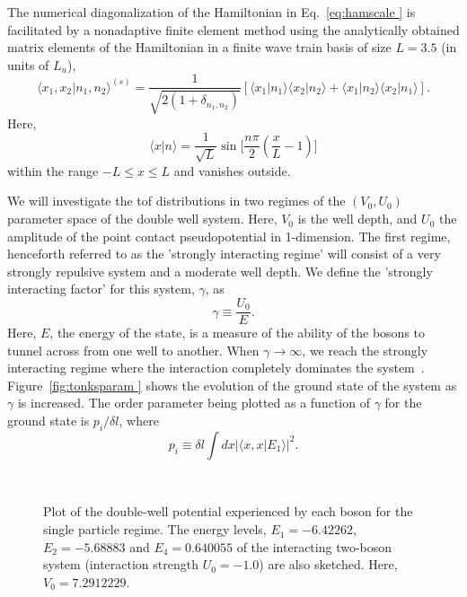\documentclass{article}
\begin{document}
The numerical diagonalization of the Hamiltonian in Eq.~\ref{eq:hamscale } is facilitated by a nonadaptive finite element method using the analytically obtained matrix elements of the Hamiltonian in a finite wave train basis of size $L=3.5$ (in units of $L_u$),
%
\begin{equation}
{\langle}x_1,x_2\vert n_1,n_2{\rangle} ^{(s)}=\frac{1}{\sqrt{2(1+\delta_{n_1,n_2})}} 
[{\langle}x_1|n_1\rangle{\langle}x_2|n_2\rangle +{\langle}x_1|n_2\rangle{\langle}x_2|n_1\rangle ].
\label{eq:symm}
\end{equation}
Here,
%
\begin{equation}
\langle x|n\rangle=\frac{1}{\sqrt{L}} \sin{\biggl[}{\frac{n\pi}{2}(\frac{x}{L}-1){\biggr]}}
\label{eq:pboxfn}
\end{equation}
%
within the range $-L\leq x \leq L$ and vanishes outside.

We will investigate the tof distributions in two regimes of the $\left(V_0,U_0\right)$ parameter space of the double well system. Here, $V_0$ is the well depth, and $U_0$ the amplitude of the point contact pseudopotential in 1-dimension.
The first regime, henceforth referred to as the 'strongly interacting regime' will consist of a very strongly repulsive system and a moderate well depth. We define the 'strongly interacting factor' for this system, $\gamma$, as 
\begin{equation}
\gamma \equiv \frac{U_0}{E}.
\end{equation}
Here, $E$, the energy of the state, is a measure of the ability of the bosons to tunnel across from one well to another. When $\gamma \rightarrow \infty$, we reach the strongly interacting regime where the interaction completely dominates the system~\cite{tonks:gas}. Figure~\ref{fig:tonksparam } shows the evolution of the ground state of the system as $\gamma$ is increased. The order parameter being plotted as a function of $\gamma$ for the ground state is $p_i/{\delta l}$, where 
\begin{equation}
p_i \equiv \delta l \int dx| \langle x , x | E_1 \rangle |^2.
\end{equation}
\begin{figure} 
\hspace*{-0.3in}
\ 
\caption{Plot of the double-well potential experienced by each boson for the single particle regime. The energy levels, $E_1=-6.42262$, $E_2=-5.68883$ and $E_4=0.640055$  of the interacting two-boson system (interaction strength  $U_0=-1.0$) are also sketched. Here, $V_0=7.2912229$.}
\label{fig:doublewell_case02}
\end{figure}
\end{document}
